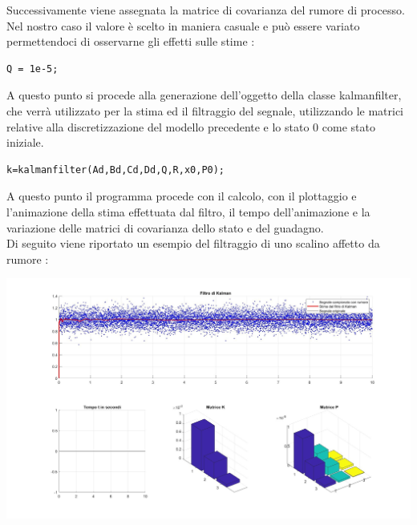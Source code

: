 Successivamente viene assegnata la matrice di covarianza del rumore di processo. Nel nostro caso il valore è scelto in maniera casuale e può essere variato permettendoci di osservarne gli effetti sulle stime :
\begin{lstlisting}[frame=single]
Q = 1e-5;
\end{lstlisting}
A questo punto si procede alla generazione dell'oggetto della classe kalmanfilter, che verrà utilizzato per la stima ed il filtraggio del segnale, utilizzando le matrici relative alla discretizzazione del modello precedente e lo stato 0 come stato iniziale.
\begin{lstlisting}[frame=single]
k=kalmanfilter(Ad,Bd,Cd,Dd,Q,R,x0,P0);
\end{lstlisting}

A questo punto il programma procede con il calcolo, con il plottaggio e l'animazione della stima effettuata dal filtro, il tempo dell'animazione e la variazione delle matrici di covarianza dello stato e del guadagno.\\
Di seguito viene riportato un esempio del filtraggio di uno scalino affetto da rumore :


\includegraphics[scale=.5]{immaginiMain/esempio.jpg} 




\newpage